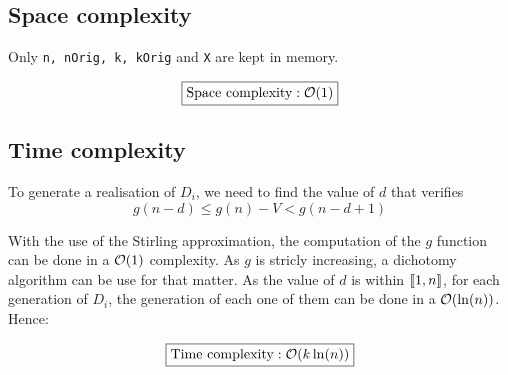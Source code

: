 \subsection{Space complexity}
	Only \verb|n, nOrig, k, kOrig| and \verb|X| are kept in memory.
	
	\[\boxed{\text{Space complexity}: \mathcal{O}(1)}\]
	
\subsection{Time complexity}
	To generate a realisation of $D_i$, we need to find the value of $d$ that verifies
		\[g(n - d)\leq g(n) - V < g(n - d + 1)\]
		
	With the use of the Stirling approximation, the computation of the $g$ function can be done in a $\mathcal{O}(1)$ complexity. As $g$ is stricly increasing, a dichotomy algorithm can be use for that matter. As the value of $d$ is within $\llbracket1, n\rrbracket$, for each generation of $D_i$, the generation of each one of them can be done in a $\mathcal{O}(\ln(n))$. Hence:
	
	\[\boxed{\text{Time complexity}: \mathcal{O}(k\ln(n))}\]